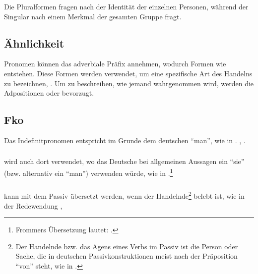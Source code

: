 \noindent Die Pluralformen fragen nach der Identität der einzelnen Personen, während der Singular nach einem Merkmal der gesamten Gruppe fragt.

\subsection{Ähnlichkeit} Pronomen können das adverbiale Präfix  annehmen, wodurch Formen wie   entstehen. Diese Formen werden verwendet, um eine spezifische Art des Handelns zu bezeichnen,  . Um zu beschreiben, wie jemand wahrgenommen wird, werden die Adpositionen  oder  bevorzugt.

\subsection{Fko} Das Indefinitpronomen  entspricht im Grunde dem deutschen ``man'', wie in .  ,  .

\subsubsection{}  wird auch dort verwendet, wo das Deutsche bei allgemeinen Aussagen ein ``sie'' (bzw. alternativ ein ``man'') verwenden würde, wie in  .\footnote{Frommers Übersetzung lautet: .}

\subsubsection{}  kann mit dem Passiv übersetzt werden, wenn der Handelnde\footnote{Der Handelnde bzw. das Agens eines Verbs im Passiv ist die Person oder Sache, die in deutschen Passivkonstruktionen meist nach der Präposition ``von'' steht, wie in .} belebt ist, wie in der Redewendung  ,  
\label{syn:prn:fko}

